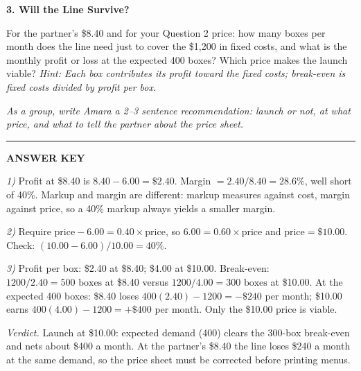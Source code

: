 \documentclass[11pt]{article}
\newcommand{\question}[1]{\medskip\noindent\textbf{#1}\par\smallskip}
\newcommand{\hint}[1]{{\small\color{gray}\textit{Hint: #1}}\par}
\begin{document}
\question{3. Will the Line Survive?}
For the partner's \$8.40 and for your Question 2 price: how many boxes per month does the line need just to cover the \$1{,}200 in fixed costs, and what is the monthly profit or loss at the expected 400 boxes? Which price makes the launch viable?
\hint{Each box contributes its profit toward the fixed costs; break-even is fixed costs divided by profit per box.}

\smallskip
\noindent\textit{As a group, write Amara a 2--3 sentence recommendation: launch or not, at what price, and what to tell the partner about the price sheet.}

\vfill

\noindent\rule{\textwidth}{0.4pt}
\begin{center}\textbf{ANSWER KEY}\end{center}
{\small
\textit{1)} Profit at \$8.40 is $8.40 - 6.00 = \$2.40$. Margin $= 2.40/8.40 = \boxed{28.6\%}$, well short of 40\%. Markup and margin are different: markup measures against cost, margin against price, so a 40\% markup always yields a smaller margin.

\textit{2)} Require $\text{price} - 6.00 = 0.40 \times \text{price}$, so $6.00 = 0.60 \times \text{price}$ and $\text{price} = \boxed{\$10.00}$. Check: $(10.00 - 6.00)/10.00 = 40\%$.

\textit{3)} Profit per box: \$2.40 at \$8.40; \$4.00 at \$10.00. Break-even: $1200/2.40 = \boxed{500 \text{ boxes}}$ at \$8.40 versus $1200/4.00 = \boxed{300 \text{ boxes}}$ at \$10.00. At the expected 400 boxes: \$8.40 loses $400(2.40) - 1200 = -\$240$ per month; \$10.00 earns $400(4.00) - 1200 = +\$400$ per month. Only the \$10.00 price is viable.

\textit{Verdict.} Launch at \$10.00: expected demand (400) clears the 300-box break-even and nets about \$400 a month. At the partner's \$8.40 the line loses \$240 a month at the same demand, so the price sheet must be corrected before printing menus.
}
\end{document}
